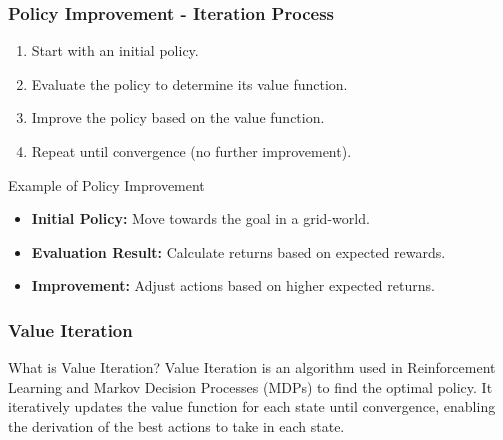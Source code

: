 \documentclass[aspectratio=169]{beamer}
\begin{document}
\begin{frame}[fragile]
    \frametitle{Policy Improvement - Iteration Process}
    \begin{enumerate}
        \item Start with an initial policy.
        \item Evaluate the policy to determine its value function.
        \item Improve the policy based on the value function.
        \item Repeat until convergence (no further improvement).
    \end{enumerate}

    \begin{block}{Example of Policy Improvement}
        \begin{itemize}
            \item \textbf{Initial Policy:} Move towards the goal in a grid-world.
            \item \textbf{Evaluation Result:} Calculate returns based on expected rewards.
            \item \textbf{Improvement:} Adjust actions based on higher expected returns.
        \end{itemize}
    \end{block}
\end{frame}

\begin{frame}[fragile]
    \frametitle{Value Iteration}
    \begin{block}{What is Value Iteration?}
        Value Iteration is an algorithm used in Reinforcement Learning and Markov Decision Processes (MDPs) to find the optimal policy. It iteratively updates the value function for each state until convergence, enabling the derivation of the best actions to take in each state.
    \end{block}
\end{frame}
\end{document}
